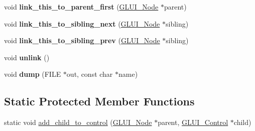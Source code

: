 \begin{DoxyCompactItemize}
\item 
\hypertarget{classGLUI__Node_a3feadb4b6d58122ff5449adfb4a323bc}{void {\bfseries link\-\_\-this\-\_\-to\-\_\-parent\-\_\-first} (\hyperlink{classGLUI__Node}{G\-L\-U\-I\-\_\-\-Node} $\ast$parent)}\label{classGLUI__Node_a3feadb4b6d58122ff5449adfb4a323bc}

\item 
\hypertarget{classGLUI__Node_ad8d7fd8a437eeec4a72b73064dc954b4}{void {\bfseries link\-\_\-this\-\_\-to\-\_\-sibling\-\_\-next} (\hyperlink{classGLUI__Node}{G\-L\-U\-I\-\_\-\-Node} $\ast$sibling)}\label{classGLUI__Node_ad8d7fd8a437eeec4a72b73064dc954b4}

\item 
\hypertarget{classGLUI__Node_a5825555fc493712a1d6f24235f59f25a}{void {\bfseries link\-\_\-this\-\_\-to\-\_\-sibling\-\_\-prev} (\hyperlink{classGLUI__Node}{G\-L\-U\-I\-\_\-\-Node} $\ast$sibling)}\label{classGLUI__Node_a5825555fc493712a1d6f24235f59f25a}

\item 
\hypertarget{classGLUI__Node_a48b62b12bf8c466fc54fbbbf30183493}{void {\bfseries unlink} ()}\label{classGLUI__Node_a48b62b12bf8c466fc54fbbbf30183493}

\item 
\hypertarget{classGLUI__Node_abce29cf0ade68e9e5702025f710cb1e8}{void {\bfseries dump} (F\-I\-L\-E $\ast$out, const char $\ast$name)}\label{classGLUI__Node_abce29cf0ade68e9e5702025f710cb1e8}

\end{DoxyCompactItemize}
\subsection*{Static Protected Member Functions}
\begin{DoxyCompactItemize}
\item 
static void \hyperlink{classGLUI__Node_a52432c3a1f3783b5f47aa3ab3dae4435}{add\-\_\-child\-\_\-to\-\_\-control} (\hyperlink{classGLUI__Node}{G\-L\-U\-I\-\_\-\-Node} $\ast$parent, \hyperlink{classGLUI__Control}{G\-L\-U\-I\-\_\-\-Control} $\ast$child)
\end{DoxyCompactItemize}
